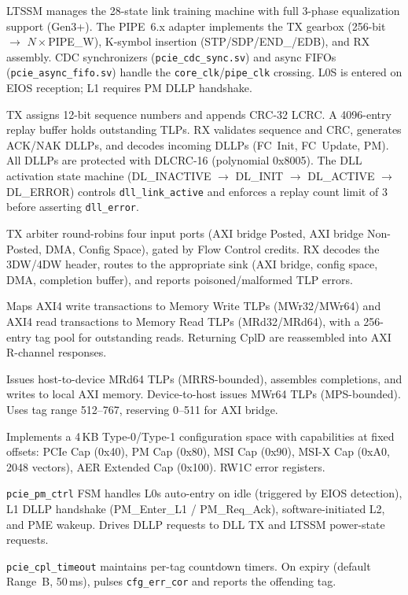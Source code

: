\documentclass[11pt,a4paper]{article}
\begin{document}
\begin{description}[leftmargin=3cm, style=nextline]
  \item[Physical Layer] LTSSM manages the 28-state link training machine with
    full 3-phase equalization support (Gen3+). The PIPE~6.x adapter implements
    the TX gearbox (256-bit $\to$ $N\times$PIPE\_W), K-symbol insertion
    (STP/SDP/END\_/EDB), and RX assembly. CDC synchronizers
    (\texttt{pcie\_cdc\_sync.sv}) and async FIFOs
    (\texttt{pcie\_async\_fifo.sv}) handle the \texttt{core\_clk}/\texttt{pipe\_clk}
    crossing. L0S is entered on EIOS reception; L1 requires PM DLLP handshake.

  \item[Data Link Layer] TX assigns 12-bit sequence numbers and appends CRC-32 LCRC.
    A 4096-entry replay buffer holds outstanding TLPs. RX validates sequence and CRC,
    generates ACK/NAK DLLPs, and decodes incoming DLLPs (FC~Init, FC~Update, PM).
    All DLLPs are protected with DLCRC-16 (polynomial 0x8005). The DLL activation
    state machine (DL\_INACTIVE $\to$ DL\_INIT $\to$ DL\_ACTIVE $\to$ DL\_ERROR)
    controls \texttt{dll\_link\_active} and enforces a replay count limit of 3
    before asserting \texttt{dll\_error}.

  \item[Transaction Layer] TX arbiter round-robins four input ports (AXI bridge Posted,
    AXI bridge Non-Posted, DMA, Config Space), gated by Flow Control credits.
    RX decodes the 3DW/4DW header, routes to the appropriate sink (AXI bridge,
    config space, DMA, completion buffer), and reports poisoned/malformed TLP errors.

  \item[AXI Bridge] Maps AXI4 write transactions to Memory Write TLPs (MWr32/MWr64)
    and AXI4 read transactions to Memory Read TLPs (MRd32/MRd64), with a 256-entry
    tag pool for outstanding reads. Returning CplD are reassembled into AXI R-channel
    responses.

  \item[DMA Engine] Issues host-to-device MRd64 TLPs (MRRS-bounded), assembles
    completions, and writes to local AXI memory. Device-to-host issues MWr64 TLPs
    (MPS-bounded). Uses tag range 512--767, reserving 0--511 for AXI bridge.

  \item[Config Space] Implements a 4\,KB Type-0/Type-1 configuration space with
    capabilities at fixed offsets: PCIe Cap (0x40), PM Cap (0x80), MSI Cap (0x90),
    MSI-X Cap (0xA0, 2048 vectors), AER Extended Cap (0x100). RW1C error registers.

  \item[Power Management] \texttt{pcie\_pm\_ctrl} FSM handles L0s auto-entry on idle
    (triggered by EIOS detection), L1 DLLP handshake (PM\_Enter\_L1 / PM\_Req\_Ack),
    software-initiated L2, and PME wakeup. Drives DLLP requests to DLL TX and
    LTSSM power-state requests.

  \item[Completion Timeout] \texttt{pcie\_cpl\_timeout} maintains per-tag countdown
    timers. On expiry (default Range~B, 50\,ms), pulses \texttt{cfg\_err\_cor} and
    reports the offending tag.
\end{description}
\end{document}
